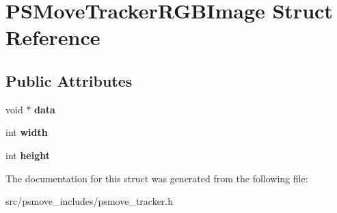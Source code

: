 \hypertarget{struct_p_s_move_tracker_r_g_b_image}{\section{P\-S\-Move\-Tracker\-R\-G\-B\-Image Struct Reference}
\label{struct_p_s_move_tracker_r_g_b_image}
}
\subsection*{Public Attributes}
\begin{DoxyCompactItemize}
\item 
\hypertarget{struct_p_s_move_tracker_r_g_b_image_acd9155ec394d83c627e0796007064d94}{void $\ast$ {\bfseries data}}\label{struct_p_s_move_tracker_r_g_b_image_acd9155ec394d83c627e0796007064d94}

\item 
\hypertarget{struct_p_s_move_tracker_r_g_b_image_a060ee64117890609c777db4c557b0caa}{int {\bfseries width}}\label{struct_p_s_move_tracker_r_g_b_image_a060ee64117890609c777db4c557b0caa}

\item 
\hypertarget{struct_p_s_move_tracker_r_g_b_image_a9837f3c3105dad3de3b9449861f1410c}{int {\bfseries height}}\label{struct_p_s_move_tracker_r_g_b_image_a9837f3c3105dad3de3b9449861f1410c}

\end{DoxyCompactItemize}


The documentation for this struct was generated from the following file\-:\begin{DoxyCompactItemize}
\item 
src/psmove\-\_\-includes/psmove\-\_\-tracker.\-h\end{DoxyCompactItemize}
